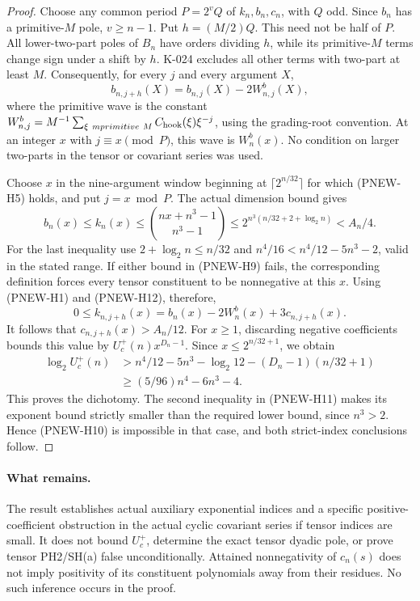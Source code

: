 \begin{proof}
Choose any common period $P=2^vQ$ of $k_n,b_n,c_n$, with $Q$ odd.
Since $b_n$ has a primitive-$M$ pole, $v\ge n-1$. Put
$h=(M/2)Q$. This need not be half of $P$.
All lower-two-part poles of $B_n$ have orders dividing $h$,
while its primitive-$M$ terms change sign under a shift by $h$.
K-024 excludes all other terms with two-part at least $M$.
Consequently, for every $j$ and every argument $X$,
\[
 b_{n,j+h}(X)=b_{n,j}(X)-2W_{n,j}^b(X),                \tag{PNEW-H12}
\]
where the primitive wave is the constant
$W_{n,j}^b=M^{-1}\sum_{\xi\ {
m primitive}\ M}
C_{\rm hook}(\xi)\xi^{-j}$, using the grading-root convention.
At an integer $x$ with $j\equiv x\pmod P$, this wave is $W_n^b(x)$.
No condition on larger two-parts in the tensor or covariant series
was used.

Choose $x$ in the nine-argument window beginning at
$\lceil2^{n/32}\rceil$ for which (PNEW-H5) holds, and put $j=x\bmod P$.
The actual dimension bound gives
\[
 b_n(x)\le k_n(x)\le\binom{nx+n^3-1}{n^3-1}
          \le2^{n^3(n/32+2+\log_2n)}<A_n/4.           \tag{PNEW-H13}
\]
For the last inequality use $2+\log_2n\le n/32$ and
$n^4/16<n^4/12-5n^3-2$, valid in the stated range.
If either bound in (PNEW-H9) fails, the corresponding definition
forces every tensor constituent to be nonnegative at this $x$.
Using (PNEW-H1) and (PNEW-H12), therefore,
\[
 0\le k_{n,j+h}(x)
     =b_n(x)-2W_n^b(x)+3c_{n,j+h}(x).
\]
It follows that $c_{n,j+h}(x)>A_n/12$.
For $x\ge1$, discarding negative coefficients bounds this value by
$U_c^+(n)x^{D_n-1}$. Since $x\le2^{n/32+1}$, we obtain
\[
 \begin{split}
 \log_2 U_c^+(n)
 &>n^4/12-5n^3-\log_2 12-(D_n-1)(n/32+1)\\
 &\ge(5/96)n^4-6n^3-4.
 \end{split}
\]
This proves the dichotomy. The second inequality in (PNEW-H11)
makes its exponent bound strictly smaller than the required lower
bound, since $n^3>2$. Hence (PNEW-H10) is impossible in that case,
and both strict-index conclusions follow.
\end{proof}

\paragraph{What remains.}
The result establishes actual auxiliary exponential indices and a
specific positive-coefficient obstruction in the actual cyclic
covariant series if tensor indices are small. It does not bound
$U_c^+$, determine the exact tensor dyadic pole, or prove tensor
PH2/SH(a) false unconditionally. Attained nonnegativity of $c_n(s)$
does not imply positivity of its constituent polynomials away from
their residues. No such inference occurs in the proof.

